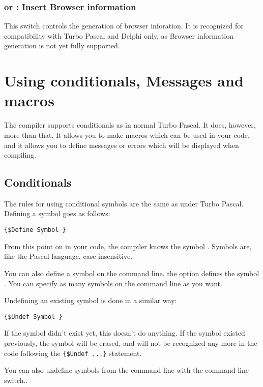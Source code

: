 \documentclass{report}
\begin{document}
\subsection{ or  : Insert Browser information}

This switch controls the generation of browser inforation. It is recognized
for compatibility with Turbo Pascal and Delphi only, as Browser information
generation is not yet fully supported.


\chapter{Using conditionals, Messages and macros}
\label{ch:CondMessageMacro}
The \fpc compiler supports conditionals as in normal Turbo Pascal. It does,
however, more than that. It allows you to make macros which can be used in
your code, and it allows you to define messages or errors which will be
displayed when compiling.

\section{Conditionals}
\label{se:Conditionals}
The rules for using conditional symbols are the same as under Turbo Pascal.
Defining a symbol goes as follows:
\begin{verbatim}
{$Define Symbol }
\end{verbatim}
From this point on in your code, the compiler knows the symbol .
Symbols are, like the Pascal language, case insensitive.

You can also define a symbol on the command line. the  option
defines the symbol . You can specify as many symbols on the
command line as you want.

Undefining an existing symbol is done in a similar way:
\begin{verbatim}
{$Undef Symbol }
\end{verbatim}
If the symbol didn't exist yet, this doesn't do anything. If the symbol
existed previously, the symbol will be erased, and will not be recognized
any more in the code following the \verb|{$Undef ...}| statement.

You can also undefine symbols from the command line with the 
command-line switch..
\end{document}
